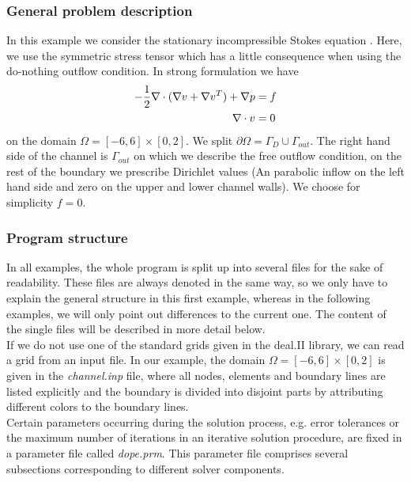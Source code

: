 \subsubsection{General problem description}
In this example we consider the stationary incompressible Stokes equation . Here,
we use the symmetric stress tensor which has a little consequence when using 
the do-nothing outflow condition. In strong formulation we have
\begin{align} \label{eq:strong}
-\frac{1}{2}\nabla\cdot (\nabla v + \nabla v^{T}) + \nabla p &= f \\ 
\nabla \cdot v &= 0 \notag
\end{align} 
on the domain $\Omega = [-6,6]\times [0,2]$. We split $\partial \Omega = \Gamma_D \cup \Gamma_{out}$. The right hand side of the channel is $\Gamma_{out}$ on which we describe the free outflow condition, on the rest of the boundary we prescribe Dirichlet values (An parabolic inflow on the left hand side and zero on the upper and lower channel walls). We choose for simplicity $f=0$.\\

\subsubsection{Program structure}

In all examples, the whole program is split up into several files for the sake of readability. These files are always denoted in the same way, so we only have to explain the general structure in this first example, whereas in the following examples, we will only point out differences to the current one. The content of the single files will be described in more detail below.\\

If we do not use one of the standard grids given in the deal.II library, we can read a grid from an input file. In our example, the domain $\Omega = [-6,6]\times [0,2]$ is given in the \textit{channel.inp} file, where all nodes, elements and boundary lines are listed explicitly and the boundary is divided into disjoint parts by attributing different colors to the boundary lines.\\

Certain parameters occurring during the solution process, e.g. error tolerances or the maximum number of iterations in an iterative solution procedure, are fixed in a parameter file called \textit{dope.prm}. This parameter file comprises several subsections corresponding to different solver components.\\


